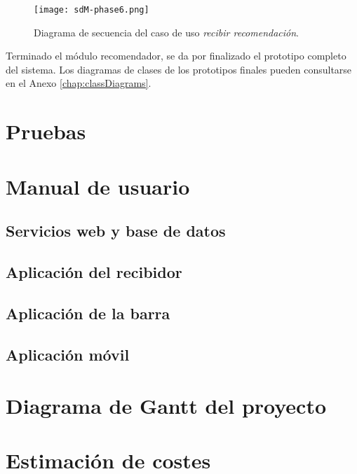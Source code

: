  \begin{sidewaysfigure}[h]
    \begin{center}
      \texttt{[image: sdM-phase6.png]}
      \caption{Diagrama de secuencia del caso de uso \emph{recibir 
      recomendación}.}
      \label{fig:sdM-phase6}
    \end{center}
  \end{sidewaysfigure}

Terminado el módulo recomendador, se da por finalizado el prototipo completo
del sistema. Los diagramas de clases de los prototipos finales pueden
consultarse en el Anexo \ref{chap:classDiagrams}.

\section{Pruebas}

\section{Manual de usuario}
  \subsection{Servicios web y base de datos}
  \subsection{Aplicación del recibidor}
  \subsection{Aplicación de la barra}
  \subsection{Aplicación móvil}

\section{Diagrama de Gantt del proyecto}

\section{Estimación de costes}


